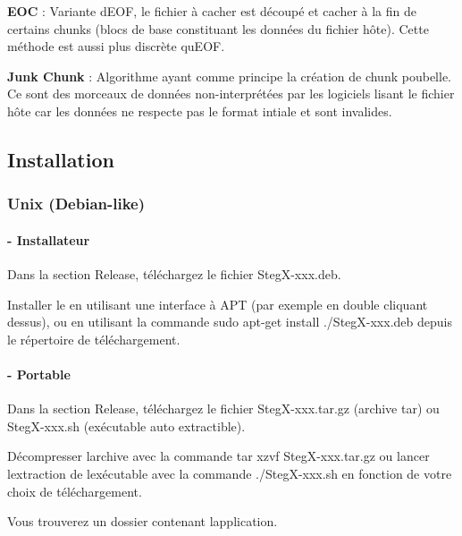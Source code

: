 \begin{DoxyItemize}
\begin{DoxyItemize}
\item {\bfseries E\+OC} \+: Variante d\textquotesingle{}E\+OF, le fichier à cacher est découpé et cacher à la fin de certains chunks (blocs de base constituant les données du fichier hôte). Cette méthode est aussi plus discrète qu\textquotesingle{}E\+OF.
\item {\bfseries Junk Chunk} \+: Algorithme ayant comme principe la création de chunk poubelle. Ce sont des morceaux de données non-\/interprétées par les logiciels lisant le fichier hôte car les données ne respecte pas le format intiale et sont invalides.
\end{DoxyItemize}
\end{DoxyItemize}





\subsection*{Installation }

\subsubsection*{Unix (Debian-\/like) }

\paragraph*{-\/ Installateur}


\begin{DoxyEnumerate}
\item Dans la section {\ttfamily Release}, téléchargez le fichier {\ttfamily Steg\+X-\/xxx.\+deb}.
\item Installer le en utilisant une interface à A\+PT (par exemple en double cliquant dessus), ou en utilisant la commande {\ttfamily sudo apt-\/get install ./\+Steg\+X-\/xxx.deb} depuis le répertoire de téléchargement.
\end{DoxyEnumerate}

\paragraph*{-\/ Portable}


\begin{DoxyEnumerate}
\item Dans la section {\ttfamily Release}, téléchargez le fichier {\ttfamily Steg\+X-\/xxx.\+tar.\+gz} (archive tar) ou {\ttfamily Steg\+X-\/xxx.\+sh} (exécutable auto extractible).
\item Décompresser l\textquotesingle{}archive avec la commande {\ttfamily tar xzvf Steg\+X-\/xxx.\+tar.\+gz} ou lancer l\textquotesingle{}extraction de l\textquotesingle{}exécutable avec la commande {\ttfamily ./\+Steg\+X-\/xxx.sh} en fonction de votre choix de téléchargement.
\item Vous trouverez un dossier contenant l\textquotesingle{}application.
\end{DoxyEnumerate}

